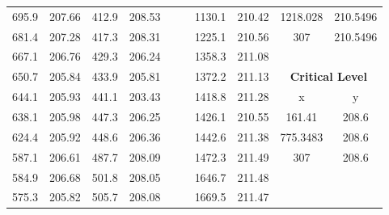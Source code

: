 \begin{center}
\begin{tabular}{|cccc||cccc||cc|}
    695.9    & 207.66                   & 412.9 & 208.53                        &       &                                     & 1130.1 & 210.42                                & 1218.028 & 210.5496                            \\
    681.4    & 207.28                   & 417.3 & 208.31                        &       &                                     & 1225.1 & 210.56                                & 307      & 210.5496                            \\
    667.1    & 206.76                   & 429.3 & 206.24                        &       &                                     & 1358.3 & 211.08                                &          &                                     \\
    650.7    & 205.84                   & 433.9 & 205.81                        &       &                                     & 1372.2 & 211.13                                & \multicolumn{2}{c|}{\textbf{Critical Level }}  \\ 
    \cline{9-10}
    644.1    & 205.93                   & 441.1 & 203.43                        &       &                                     & 1418.8 & 211.28                                & x        & y                                   \\
    638.1    & 205.98                   & 447.3 & 206.25                        &       &                                     & 1426.1 & 210.55                                & 161.41   & 208.6                               \\
    624.4    & 205.92                   & 448.6 & 206.36                        &       &                                     & 1442.6 & 211.38                                & 775.3483 & 208.6                               \\
    587.1    & 206.61                   & 487.7 & 208.09                        &       &                                     & 1472.3 & 211.49                                & 307      & 208.6                               \\
    584.9    & 206.68                   & 501.8 & 208.05                        &       &                                     & 1646.7 & 211.48                                &          &                                     \\
    575.3    & 205.82                   & 505.7 & 208.08                        &       &                                     & 1669.5 & 211.47                                &          &                                     \\

\end{tabular}
\end{center}
